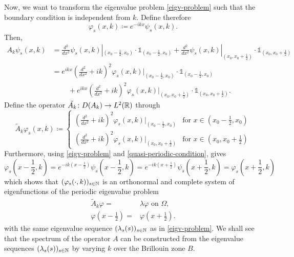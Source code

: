 Now, we want to transform the eigenvalue problem \eqref{eigv-problem} such that the boundary condition is independent from $k$. Define therefore
	\[ \varphi_{s}(x, k) \coloneqq e^{-ikx} \psi_{s}(x, k). \]
Then,
	\begin{align*}
		A_{k} \psi_{s}(x, k) & = \frac{d^{2}}{dx^{2}} \psi_{s}(x, k)|_{(x_{0} - \frac{1}{2}, x_{0})} \cdot \mathds{1}_{(x_{0} - \frac{1}{2}, x_{0})} + \frac{d^{2}}{dx^{2}} \psi_{s}(x, k)|_{(x_{0}, x_{0}  + \frac{1}{2})} \cdot \mathds{1}_{(x_{0}, x_{0} + \frac{1}{2})} \\
				& = e^{ikx} \left( \frac{d^{2}}{dx^{2}} + ik \right)^{2} \varphi_{s}(x, k)|_{(x_{0} - \frac{1}{2}, x_{0})} \cdot \mathds{1}_{(x_{0} - \frac{1}{2}, x_{0})} \\
				& ~\qquad + e^{ikx} \left( \frac{d^{2}}{dx^{2}} + ik \right)^{2} \varphi_{s}(x, k)|_{(x_{0}, x_{0}  + \frac{1}{2})} \cdot \mathds{1}_{(x_{0}, x_{0} + \frac{1}{2})}.
	\end{align*}
Define the operator $\tilde{A_{k}} \colon D(A_{k}) \rightarrow L^{2}(\mathbb{R})$ through 
	\[ \tilde{A}_{k} \varphi_{s}(x, k) \coloneqq \begin{cases}
 		\left( \frac{d^{2}}{dx^{2}} + ik \right)^{2} \varphi_{s}(x, k)|_{(x_{0} - \frac{1}{2}, x_{0})} & \text{for } x \in (x_{0} - \frac{1}{2}, x_{0}) \\ \left( \frac{d^{2}}{dx^{2}} + ik \right)^{2} \varphi_{s}(x, k)|_{(x_{0}, x_{0}  + \frac{1}{2})} & \text{for } x \in (x_{0}, x_{0} + \frac{1}{2})
 	\end{cases} \] 
Furthermore, using \eqref{eigv-problem} and \eqref{quasi-periodic-condition}, gives
		\[ \varphi_{s}(x - \frac{1}{2}, k) = e^{-ik(x - \frac{1}{2})} \psi_{s}(x - \frac{1}{2}, k) = e^{-ik(x + \frac{1}{2})} \psi_{s}(x + \frac{1}{2}, k) = \varphi_{s}(x + \frac{1}{2}, k) \]
which shows that $(\varphi_{s}(\cdot, k))_{s \in \mathbb{N}}$ is an orthonormal and complete system of eigenfunctions of the periodic eigenvalue problem
	\begin{eqnarray}
		\tilde{A}_{k} \varphi = & \lambda
		 \varphi \text{ on } \Omega, \label{mod-eigv-problem} \\
		 \varphi(x - \frac{1}{2}) = & \varphi(x + \frac{1}{2}). \label{periodic-condition}
	\end{eqnarray}
with the same eigenvalue sequence $(\lambda_{s}(s))_{s \in \mathbb{N}}$ as in \eqref{eigv-problem}. We shall see that the spectrum of the operator $A$ can be constructed from the eigenvalue sequences $(\lambda_{s}(s))_{s \in \mathbb{N}}$ by varying $k$ over the Brillouin zone $B$.\\
	
